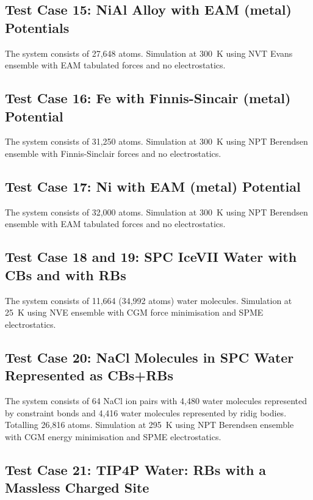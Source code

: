\subsection{Test Case 15: NiAl Alloy with EAM (metal) Potentials}

The system consists of 27,648 atoms.  Simulation at 300~K using NVT
Evans ensemble with EAM tabulated forces and no electrostatics.

\subsection{Test Case 16: Fe with Finnis-Sincair (metal) Potential}

The system consists of 31,250 atoms.  Simulation at 300~K using NPT
Berendsen ensemble with Finnis-Sinclair forces and no electrostatics.

\subsection{Test Case 17: Ni with EAM (metal) Potential}

The system consists of 32,000 atoms.  Simulation at 300~K using NPT
Berendsen ensemble with EAM tabulated forces and no electrostatics.

\subsection{Test Case 18 and 19: SPC IceVII Water with CBs and with RBs}

The system consists of 11,664 (34,992 atoms) water molecules. Simulation
at 25~K using NVE ensemble with CGM force minimisation and SPME electrostatics.

\subsection{Test Case 20: NaCl Molecules in SPC Water Represented as CBs+RBs}

The system consists of 64 NaCl ion pairs with 4,480 water molecules
represented by constraint bonds and 4,416 water molecules represented
by ridig bodies.  Totalling 26,816 atoms.  Simulation at 295~K using NPT
Berendsen ensemble with CGM energy minimisation and SPME electrostatics.

\subsection{Test Case 21: TIP4P Water: RBs with a Massless Charged Site}

